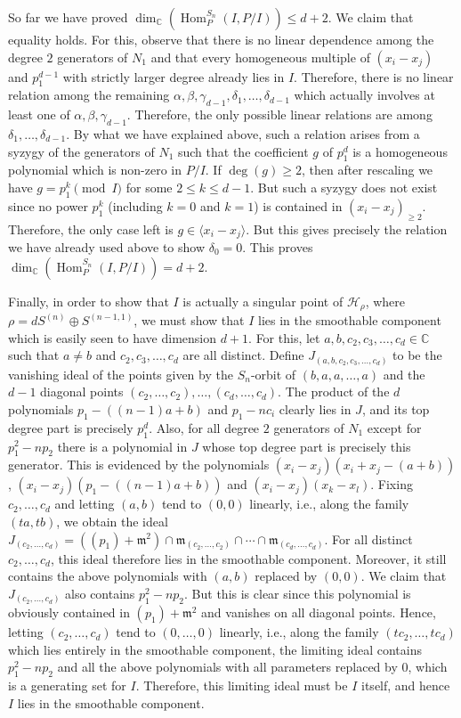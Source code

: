 \documentclass[11pt]{amsart}
\theoremstyle{definition}
\newcommand{\CC}{\mathbb{C}}
\newcommand{\mm}{\mathfrak{m}}
\newcommand{\HH}{\mathcal{H}}
\DeclareMathOperator{\Hom}{Hom}
\begin{document}
So far we have proved $\dim_\CC(\Hom^{S_n}_P(I,P/I)) \leq d+2$. We claim that equality holds. For this, observe that there is no linear dependence among the degree $2$ generators of $N_1$ and that every homogeneous multiple of $(x_i-x_j)$ and $p_1^{d-1}$ with strictly larger degree already lies in $I$. Therefore, there is no linear relation among the remaining $\alpha,\beta,\gamma_{d-1},\delta_1,\ldots,\delta_{d-1}$ which actually involves at least one of $\alpha, \beta, \gamma_{d-1}$. Therefore, the only possible linear relations are among $\delta_1, \ldots, \delta_{d-1}$. By what we have explained above, such a relation arises from a syzygy of the generators of $N_1$ such that the coefficient $g$ of $p_1^d$ is a homogeneous polynomial which is non-zero in $P/I$. If $\deg(g) \geq 2$, then after rescaling we have $g = p_1^k \pmod I$ for some $2 \leq k \leq d-1$. But such a syzygy does not exist since no power $p_1^k$ (including $k = 0$ and $k = 1$) is contained in $(x_i - x_j)_{\geq 2}$. Therefore, the only case left is $g \in \langle x_i - x_j \rangle$. But this gives precisely the relation we have already used above to show $\delta_0 = 0$. This proves $\dim_\CC(\Hom^{S_n}_P(I,P/I)) = d+2$.

Finally, in order to show that $I$ is actually a singular point of $\HH_\rho$, where $\rho = d S^{(n)} \oplus S^{(n-1,1)}$, we must show that $I$ lies in the smoothable component which is easily seen to have dimension $d+1$. For this, let $a, b, c_2, c_3, \ldots, c_d \in \CC$ such that $a \neq b$ and $c_2, c_3, \ldots, c_d$ are all distinct. Define $J_{(a,b,c_2,c_3,\ldots,c_d)}$ to be the vanishing ideal of the points given by the $S_n$-orbit of $(b,a,a,\ldots,a)$ and the $d-1$ diagonal points $(c_2,\ldots, c_2), \ldots, (c_d, \ldots, c_d)$. The product of the $d$ polynomials $p_1 - ((n-1)a + b)$ and $p_1 - n c_i$ clearly lies in $J$, and its top degree part is precisely $p_1^d$. Also, for all degree $2$ generators of $N_1$ except for $p_1^2 - np_2$ there is a polynomial in $J$ whose top degree part is precisely this generator. This is evidenced by the polynomials $(x_i - x_j)(x_i + x_j - (a+b))$, $(x_i - x_j)(p_1 - ((n-1)a + b))$ and $(x_i - x_j)(x_k - x_l)$. Fixing $c_2, \ldots, c_d$ and letting $(a,b)$ tend to $(0,0)$ linearly, i.e., along the family $(ta,tb)$, we obtain the ideal $J_{(c_2,\ldots,c_d)} = ((p_1) + \mm^2) \cap \mm_{(c_2,\ldots,c_2)} \cap \cdots \cap \mm_{(c_d,\ldots,c_d)}$. For all distinct $c_2, \ldots, c_d$, this ideal therefore lies in the smoothable component. Moreover, it still contains the above polynomials with $(a,b)$ replaced by $(0,0)$. We claim that $J_{(c_2,\ldots,c_d)}$ also contains $p_1^2 - n p_2$. But this is clear since this polynomial is obviously contained in $(p_1) + \mm^2$ and vanishes on all diagonal points. Hence, letting $(c_2, \ldots, c_d)$ tend to $(0,\ldots, 0)$ linearly, i.e., along the family $(tc_2,\ldots, tc_d)$ which lies entirely in the smoothable component, the limiting ideal contains $p_1^2 - np_2$ and all the above polynomials with all parameters replaced by $0$, which is a generating set for $I$. Therefore, this limiting ideal must be $I$ itself, and hence $I$ lies in the smoothable component.
\end{document}
